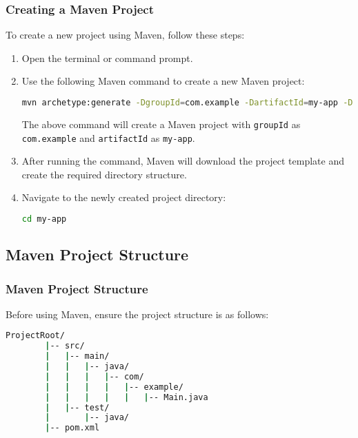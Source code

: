 \documentclass[aspectratio=169, table]{beamer}
\begin{document}
\begin{frame}[fragile]
	\vspace{20pt}
	\frametitle{Creating a Maven Project}
	To create a new project using Maven, follow these steps:
	\begin{enumerate}
		\item Open the terminal or command prompt.
		\item Use the following Maven command to create a new Maven project:
		\begin{lstlisting}[language=bash]
			mvn archetype:generate -DgroupId=com.example -DartifactId=my-app -DarchetypeArtifactId=maven-archetype-quickstart -DinteractiveMode=false
		\end{lstlisting}
		The above command will create a Maven project with \texttt{groupId} as \texttt{com.example} and \texttt{artifactId} as \texttt{my-app}.
		\item After running the command, Maven will download the project template and create the required directory structure.
		\item Navigate to the newly created project directory:
		\begin{lstlisting}[language=bash]
			cd my-app
		\end{lstlisting}
	\end{enumerate}
\end{frame}

\subsection{Maven Project Structure}
\begin{frame}[fragile]
	\frametitle{Maven Project Structure}
	Before using Maven, ensure the project structure is as follows:
	\begin{lstlisting}[language=bash]
		ProjectRoot/
		|-- src/
		|   |-- main/
		|   |   |-- java/
		|   |   |   |-- com/
		|   |   |   |   |-- example/
		|   |   |   |   |   |-- Main.java
		|   |-- test/
		|       |-- java/
		|-- pom.xml
	\end{lstlisting}
\end{frame}
\end{document}

